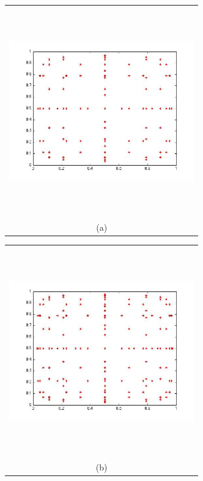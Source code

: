 \documentclass{article}
\newcommand{\Pic}[2][0.85]{\begin{center}\texttt{[image: \#2]}
 \end{center} }
\begin{document}
\begin{figure}[H]
      \begin{minipage}[b]{0.6\textwidth}
        \begin{tabular}{c}
       \includegraphics[width=8cm,height=9cm,keepaspectratio]{fig/GQU_2_6.jpg}\\
        (a)
        \end{tabular}
    \end{minipage}
    \begin{minipage}{0.6\textwidth}
        \begin{tabular}{c}
	\includegraphics[width=8cm,height=9cm,keepaspectratio]{fig/GQU_2_7.jpg}\\
        (b)
        \end{tabular}

\end{minipage}
\end{figure}
\end{document}
